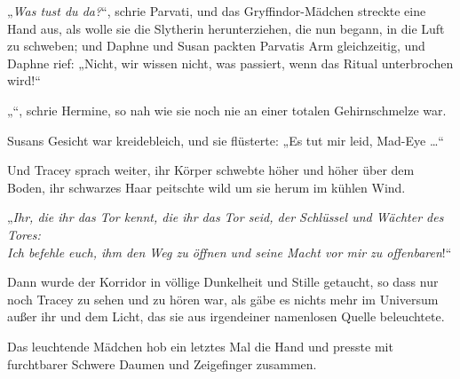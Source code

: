 „\emph{Was tust du da?}“, schrie Parvati, und das Gryffindor-Mädchen streckte eine Hand aus, als wolle sie die Slytherin herunterziehen, die nun begann, in die Luft zu schweben; und Daphne und Susan packten Parvatis Arm gleichzeitig, und Daphne rief:
„Nicht, wir wissen nicht, was passiert, wenn das Ritual unterbrochen wird!“

„“, schrie Hermine, so nah wie sie noch nie an einer totalen Gehirnschmelze war.

Susans Gesicht war kreidebleich, und sie flüsterte:
„Es tut mir leid, Mad-Eye …“

Und Tracey sprach weiter, ihr Körper schwebte höher und höher über dem Boden, ihr schwarzes Haar peitschte wild um sie herum im kühlen Wind.

„\emph{Ihr, die ihr das Tor kennt, die ihr das Tor seid, der Schlüssel und Wächter des Tores:\\
Ich befehle euch, ihm den Weg zu öffnen und seine Macht vor mir zu offenbaren}!“

Dann wurde der Korridor in völlige Dunkelheit und Stille getaucht, so dass nur noch Tracey zu sehen und zu hören war, als gäbe es nichts mehr im Universum außer ihr und dem Licht, das sie aus irgendeiner namenlosen Quelle beleuchtete.

Das leuchtende Mädchen hob ein letztes Mal die Hand und presste mit furchtbarer Schwere Daumen und Zeigefinger zusammen.

